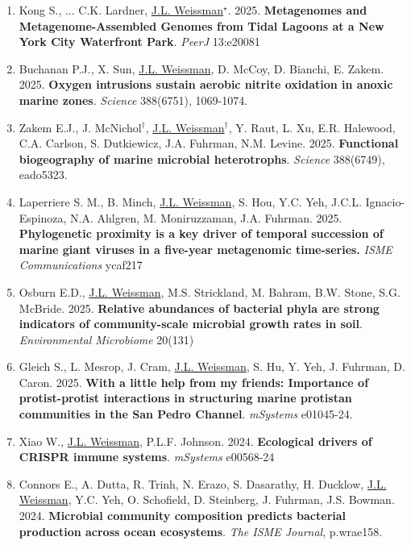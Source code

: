 \documentclass[]{res}
\begin{document}
\begin{resume}
\begin{enumerate}
\item Kong S., ... C.K. Lardner, \underline{J.L. Weissman$^\star$}. 2025. {\bf Metagenomes and Metagenome-Assembled Genomes from Tidal Lagoons at a New York City Waterfront Park}. \emph{PeerJ} 13:e20081

\item Buchanan P.J., X. Sun, \underline{J.L. Weissman}, D. McCoy, D. Bianchi, E. Zakem. 2025. {\bf Oxygen intrusions sustain aerobic nitrite 
oxidation in anoxic marine zones}. \emph{Science} 388(6751), 1069-1074.
 
\item Zakem E.J., J. McNichol$^\dagger$, \underline{J.L. Weissman}$^\dagger$, Y. Raut, L. Xu, E.R. Halewood, C.A. Carlson, S. Dutkiewicz, J.A. Fuhrman, N.M. Levine. 2025. {\bf Functional biogeography of marine microbial heterotrophs}. \emph{Science} 388(6749), eado5323.

 \item Laperriere S. M., B. Minch,  \underline{J.L. Weissman}, S. Hou, Y.C. Yeh, J.C.L. Ignacio-Espinoza, N.A. Ahlgren, M. Moniruzzaman, J.A. Fuhrman. 2025. {\bf Phylogenetic proximity is a key driver of temporal succession of marine giant viruses in a five-year metagenomic time-series.} \emph{ISME Communications} ycaf217
 
\item Osburn E.D., \underline{J.L. Weissman}, M.S. Strickland, M. Bahram, B.W. Stone, S.G. McBride. 2025. {\bf Relative abundances of bacterial phyla are strong indicators of community-scale microbial growth rates in soil}. \emph{Environmental Microbiome} 20(131)

\item Gleich S., L. Mesrop, J. Cram, \underline{J.L. Weissman}, S. Hu, Y. Yeh, J. Fuhrman, D. Caron. 2025. {\bf With a little help from my friends: Importance of protist-protist interactions in structuring marine protistan communities in the San Pedro Channel}. \emph{mSystems} e01045-24.

\item Xiao W., \underline{J.L. Weissman}, P.L.F. Johnson. 2024. {\bf Ecological drivers of CRISPR immune systems}. \emph{mSystems} e00568-24
 
 \item Connors E., A. Dutta, R. Trinh, N. Erazo, S. Dasarathy, H. Ducklow, \underline{J.L. Weissman}, Y.C. Yeh, O. Schofield, D. Steinberg, J. Fuhrman, J.S. Bowman. 2024. {\bf Microbial community composition predicts bacterial production across ocean ecosystems}. \emph{The ISME Journal}, p.wrae158.
 

\end{enumerate}
\end{resume}
\end{document}
